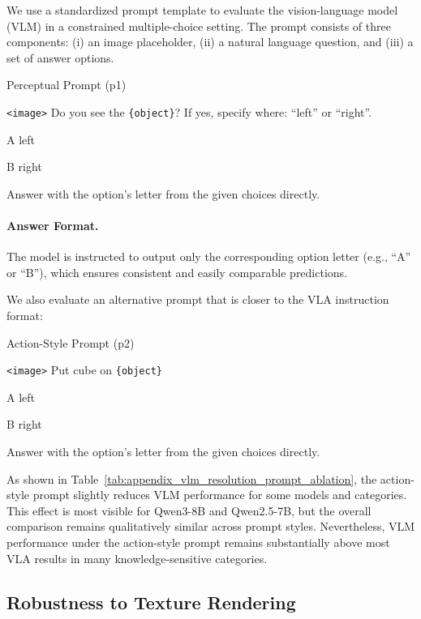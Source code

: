 \documentclass{llmxive}
\providecommand{\prompttok}[1]{\texttt{#1}}
\providecommand{\promptvar}[1]{\texttt{#1}}
\begin{document}
We use a standardized prompt template to evaluate the vision-language model (VLM) in a constrained multiple-choice setting. 
The prompt consists of three components: (i) an image placeholder, (ii) a natural language question, and (iii) a set of answer options.

\begin{promptbox}{Perceptual Prompt (p1)}
{\small\ttfamily
\prompttok{\textless image\textgreater} Do you see the \promptvar{\{object\}}? If yes, specify where: ``left'' or ``right''.\par
\medskip
A left\par
B right\par
\medskip
Answer with the option's letter from the given choices directly.
}
\end{promptbox}

\paragraph{Answer Format.}
The model is instructed to output only the corresponding option letter (e.g., ``A'' or ``B''), which ensures consistent and easily comparable predictions.

We also evaluate an alternative prompt that is closer to the VLA instruction format:

\begin{promptbox}{Action-Style Prompt (p2)}
{\small\ttfamily
\prompttok{\textless image\textgreater} Put cube on \promptvar{\{object\}}\par
\medskip
A left\par
B right\par
\medskip
Answer with the option's letter from the given choices directly.
}
\end{promptbox}

\noindent As shown in Table~\ref{tab:appendix_vlm_resolution_prompt_ablation}, the action-style prompt slightly reduces VLM performance for some models and categories.
This effect is most visible for Qwen3-8B and Qwen2.5-7B, but the overall comparison remains qualitatively similar across prompt styles.
Nevertheless, VLM performance under the action-style prompt remains substantially above most VLA results in many knowledge-sensitive categories.

\subsection{Robustness to Texture Rendering}
\end{document}
